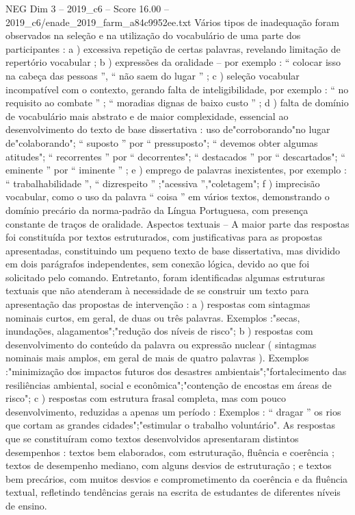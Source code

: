 \begin{textsample}{NEG Dim 3 – 2019\_c6 – Score 16.00 – 2019\_c6/enade\_2019\_farm\_a84c9952ee.txt}
Vários tipos de inadequação foram observados na seleção e na utilização do vocabulário de uma parte dos participantes : a ) excessiva repetição de certas palavras, revelando limitação de repertório vocabular ; b ) expressões da oralidade – por exemplo : “ colocar isso na cabeça das pessoas ”, “ não saem do lugar ” ; c ) seleção vocabular incompatível com o contexto, gerando falta de inteligibilidade, por exemplo : “ no requisito ao combate ” ; “ moradias dignas de baixo custo ” ; d ) falta de domínio de vocabulário mais abstrato e de maior complexidade, essencial ao desenvolvimento do texto de base dissertativa : uso de"corroborando"no lugar de"colaborando"; “ suposto ” por “ pressuposto"; “ devemos obter algumas atitudes"; “ recorrentes ” por “ decorrentes"; “ destacados ” por “ descartados"; “ eminente ” por “ iminente ” ; e ) emprego de palavras inexistentes, por exemplo : “ trabalhabilidade ”, “ dizrespeito ” ;"acessiva ”,"coletagem"; f ) imprecisão vocabular, como o uso da palavra “ coisa ” em vários textos, demonstrando o domínio precário da norma-padrão da Língua Portuguesa, com presença constante de traços de oralidade.
Aspectos textuais – A maior parte das respostas foi constituída por textos estruturados, com justificativas para as propostas apresentadas, constituindo um pequeno texto de base dissertativa, mas dividido em dois parágrafos independentes, sem conexão lógica, devido ao que foi solicitado pelo comando.
Entretanto, foram identificadas algumas estruturas textuais que não atenderam à necessidade de se construir um texto para apresentação das propostas de intervenção : a ) respostas com sintagmas nominais curtos, em geral, de duas ou três palavras.
Exemplos :"secas, inundações, alagamentos";"redução dos níveis de risco"; b ) respostas com desenvolvimento do conteúdo da palavra ou expressão nuclear ( sintagmas nominais mais amplos, em geral de mais de quatro palavras ).
Exemplos :"minimização dos impactos futuros dos desastres ambientais";"fortalecimento das resiliências ambiental, social e econômica";"contenção de encostas em áreas de risco"; c ) respostas com estrutura frasal completa, mas com pouco desenvolvimento, reduzidas a apenas um período : Exemplos : “ dragar ” os rios que cortam as grandes cidades";"estimular o trabalho voluntário".
As respostas que se constituíram como textos desenvolvidos apresentaram distintos desempenhos : textos bem elaborados, com estruturação, fluência e coerência ; textos de desempenho mediano, com alguns desvios de estruturação ; e textos bem precários, com muitos desvios e comprometimento da coerência e da fluência textual, refletindo tendências gerais na escrita de estudantes de diferentes níveis de ensino.

\end{textsample}
